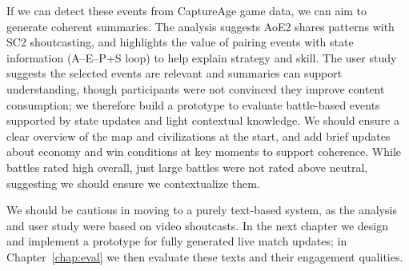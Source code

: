 If we can detect these events from CaptureAge game data, we can aim to generate coherent summaries. The analysis suggests AoE2 shares patterns with SC2 shoutcasting, and highlights the value of pairing events with state information (A--E--P+S loop) to help explain strategy and skill. The user study suggests the selected events are relevant and summaries can support understanding, though participants were not convinced they improve content consumption; we therefore build a prototype to evaluate battle-based events supported by state updates and light contextual knowledge. We should ensure a clear overview of the map and civilizations at the start, and add brief updates about economy and win conditions at key moments to support coherence. While battles rated high overall, just large battles were not rated above neutral, suggesting we should ensure we contextualize them.

We should be cautious in moving to a purely text-based system, as the analysis and user study were based on video shoutcasts. In the next chapter we design and implement a prototype for fully generated live match updates; in Chapter~\ref{chap:eval} we then evaluate these texts and their engagement qualities.
